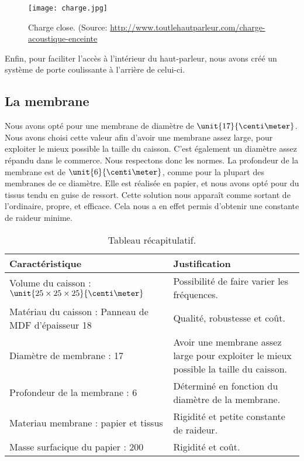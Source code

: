\begin{figure}[!hbt]
\centering
\texttt{[image: charge.jpg]}
\caption{Charge close. (Source: \url{http://www.toutlehautparleur.com/charge-acoustique-enceinte}}
\label{charge}
\end{figure}


Enfin, pour faciliter l'accès à l'intérieur du haut-parleur, nous avons créé un système de porte coulissante
à l'arrière de celui-ci.

\subsection{La membrane}
Nous avons opté pour une membrane de diamètre de $\unit{17}{\centi\meter}$. Nous avons choisi cette valeur afin
d'avoir une membrane assez large, pour exploiter le mieux possible la taille du caisson. C'est également un
diamètre assez répandu dans le commerce\cite{tlhp}. Nous respectons donc les normes.
La profondeur de la membrane est de $\unit{6}{\centi\meter}$, comme pour la plupart des membranes de ce
diamètre\cite{tlhp}. Elle est réalisée en papier, et nous avons opté pour du tissus tendu en guise de ressort.
Cette solution nous apparaît comme sortant de l'ordinaire, propre, et efficace. Cela nous a en effet permis
d'obtenir une constante de raideur minime.

\begin{table}[htb!]
	\centering
	\begin{tabularx}{\textwidth}{|X|X|}
	\hline
	\textbf{Caractéristique} & \textbf{Justification} \\
	\hline
	Volume du caisson : $\unit{25\times25\times25}{\centi\meter}$ & Possibilité de faire varier les fréquences. \\
	\hline
	Matériau du caisson : Panneau de MDF
	d'épaisseur \unit{18}{\milli\meter} & Qualité, robustesse et coût. \\
	\hline
	Diamètre de membrane : \unit{17}{\centi\meter} & Avoir une membrane assez large pour exploiter le mieux possible la taille du caisson. \\
	\hline
	Profondeur de la membrane : \unit{6}{\centi\meter} & Déterminé en fonction du diamètre de la membrane. \\
	\hline
	Materiau membrane : papier et tissus & Rigidité et petite constante de raideur. \\
	\hline
	Masse surfacique du papier : \unit{200}{\gram\per\meter\squared} & Rigidité et coût. \\
	\hline
	\end{tabularx}
	\caption{Tableau récapitulatif.}
\end{table}

